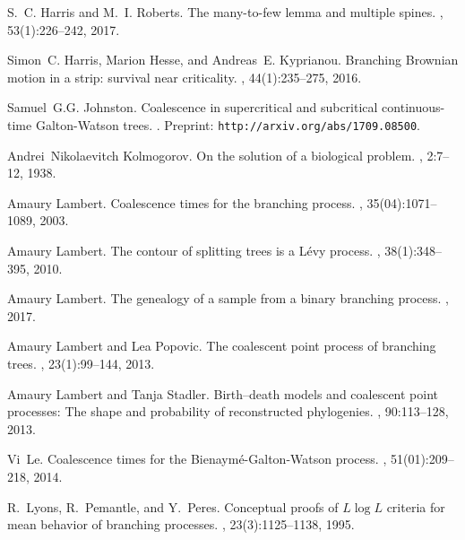 \documentclass{article}
\theoremstyle{plain}
\theoremstyle{definition}
\begin{document}
\begin{thebibliography}{10}
S.~C. Harris and M.~I. Roberts.
\newblock The many-to-few lemma and multiple spines.
, 53(1):226--242, 2017.

Simon~C. Harris, Marion Hesse, and Andreas~E. Kyprianou.
\newblock Branching {B}rownian motion in a strip: survival near criticality.
, 44(1):235--275, 2016.

Samuel~G.G. Johnston.
\newblock Coalescence in supercritical and subcritical continuous-time
  {G}alton-{W}atson trees.
.
\newblock Preprint: \texttt{http://arxiv.org/abs/1709.08500}.

Andrei~Nikolaevitch Kolmogorov.
\newblock On the solution of a biological problem.
, 2:7--12, 1938.

Amaury Lambert.
\newblock Coalescence times for the branching process.
, 35(04):1071--1089, 2003.

Amaury Lambert.
\newblock The contour of splitting trees is a {L}{\'e}vy process.
, 38(1):348--395, 2010.

Amaury Lambert.
\newblock The genealogy of a sample from a binary branching process.
, 2017.

Amaury Lambert and Lea Popovic.
\newblock The coalescent point process of branching trees.
, 23(1):99--144, 2013.

Amaury Lambert and Tanja Stadler.
\newblock Birth--death models and coalescent point processes: The shape and
  probability of reconstructed phylogenies.
, 90:113--128, 2013.

Vi~Le.
\newblock Coalescence times for the {B}ienaym{\'e}-{G}alton-{W}atson process.
, 51(01):209--218, 2014.

R.~Lyons, R.~Pemantle, and Y.~Peres.
\newblock Conceptual proofs of {$L\log L$} criteria for mean behavior of
  branching processes.
, 23(3):1125--1138, 1995.


\end{thebibliography}
\end{document}
